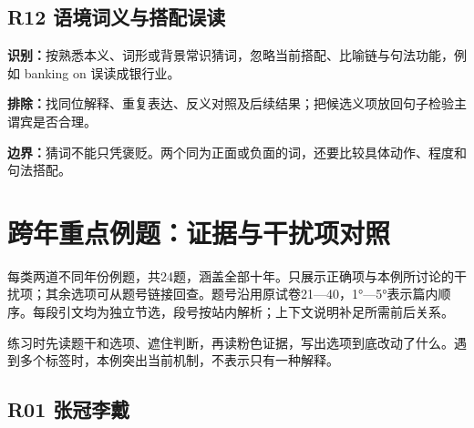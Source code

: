 \documentclass[11pt,a4paper]{article}
\begin{document}
\subsection{R12 语境词义与搭配误读}\label{cat-R12}
\noindent\textbf{识别：}按熟悉本义、词形或背景常识猜词，忽略当前搭配、比喻链与句法功能，例如 banking on 误读成银行业。\par
\noindent\textbf{排除：}找同位解释、重复表达、反义对照及后续结果；把候选义项放回句子检验主谓宾是否合理。\par
\noindent\textbf{边界：}猜词不能只凭褒贬。两个同为正面或负面的词，还要比较具体动作、程度和句法搭配。\par
\clearpage\section{跨年重点例题：证据与干扰项对照}\label{cases}
每类两道不同年份例题，共24题，涵盖全部十年。只展示正确项与本例所讨论的干扰项；其余选项可从题号链接回查。题号沿用原试卷21—40，1°—5°表示篇内顺序。每段引文均为独立节选，段号按站内解析；上下文说明补足所需前后关系。\par
练习时先读题干和选项、遮住判断，再读粉色证据，写出选项到底改动了什么。遇到多个标签时，本例突出当前机制，不表示只有一种解释。\par
\subsection{R01 张冠李戴}
\end{document}
